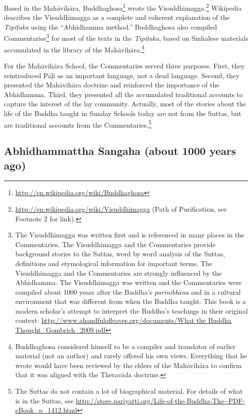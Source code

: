 Based in the Mahāvihāra, Buddhaghosa\footnote{\url{http://en.wikipedia.org/wiki/Buddhaghosa}} wrote the Visuddhimagga.\footnote{\url{http://en.wikipedia.org/wiki/Visuddhimagga} (Path of Purification, see Footnote 2 for link).} Wikipedia describes the Visuddhimagga as a complete and coherent explanation of the \textit{Tipiṭaka} using the “Abhidhamma method.” Buddhaghosa also compiled Commentaries\footnote{The Visuddhimagga was written first and is referenced in many places in the Commentaries. The Visuddhimagga and the Commentaries provide background stories to the Suttas, word by word analysis of the Suttas, definitions and etymological information for important terms. The Visuddhimagga and the Commentaries are strongly influenced by the Abhidhamma. The Visuddhimagga was written and the Commentaries were compiled about 1000 years after the Buddha’s \textit{parinibbāna} and in a cultural environment that was different from when the Buddha taught. This book is a modern scholar’s attempt to interpret the Buddha’s teachings in their original context: \url{http://www.ahandfulofleaves.org/documents/What the Buddha Thought_Gombrich_2009.pdf}} for most of the texts in the \textit{Tipiṭaka}, based on Sinhalese materials accumulated in the library of the Mahāvihāra.\footnote{Buddhaghosa considered himself to be a compiler and translator of earlier material (not an author) and rarely offered his own views. Everything that he wrote would have been reviewed by the elders of the Mahāvihāra to confirm that it was aligned with the Theravāda doctrine.}

For the Mahāvihāra School, the Commentaries served three purposes. First, they reintroduced Pāḷi as an important language, not a dead language. Second, they presented the Mahāvihāra doctrine and reinforced the importance of the Abhidhamma. Third, they presented all the accumulated traditional accounts to capture the interest of the lay community. Actually, most of the stories about the life of the Buddha taught in Sunday Schools today are not from the Suttas, but are traditional accounts from the Commentaries.\footnote{The Suttas do not contain a lot of biographical material. For details of what is in the Suttas, see \url{http://store.pariyatti.org/Life-of-the-Buddha-The--PDF-eBook_p_1412.html}}

\subsection*{Abhidhammattha Sangaha (about 1000 years ago)}

